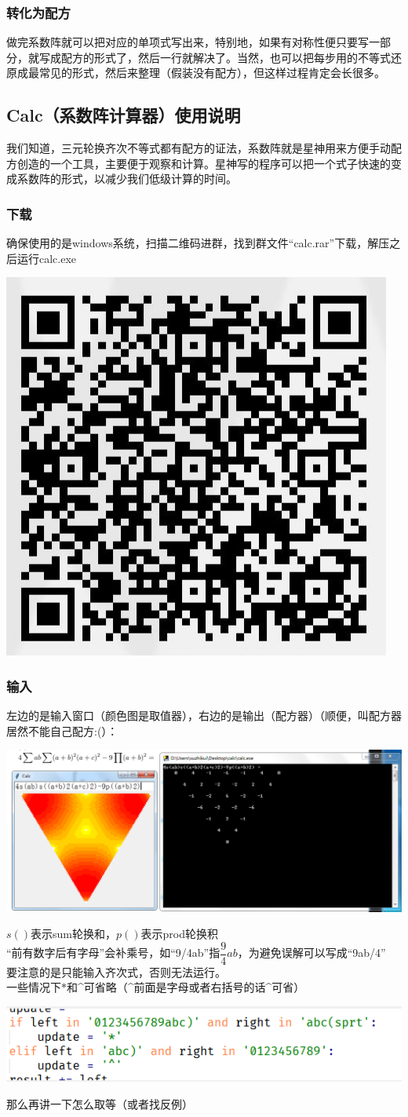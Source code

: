 \documentclass[UTF8]{ctexart}
\begin{document}
\subsubsection{转化为配方}
做完系数阵就可以把对应的单项式写出来，特别地，如果有对称性便只要写一部分，就写成配方的形式了，然后一行就解决了。当然，也可以把每步用的不等式还原成最常见的形式，然后来整理（假装没有配方），但这样过程肯定会长很多。
\subsection{Calc（系数阵计算器）使用说明}
我们知道，三元轮换齐次不等式都有配方的证法，系数阵就是星神用来方便手动配方创造的一个工具，主要便于观察和计算。星神写的程序可以把一个式子快速的变成系数阵的形式，以减少我们低级计算的时间。
\subsubsection{下载}
确保使用的是windows系统，扫描二维码进群，找到群文件“calc.rar”下载，解压之后运行calc.exe
\begin{center}
	\includegraphics[width=0.25\linewidth]{001}
\end{center}
\subsubsection{输入}
左边的是输入窗口（颜色图是取值器），右边的是输出（配方器）（顺便，叫配方器居然不能自己配方:(）：
\begin{center}
	\includegraphics[width=0.85\linewidth]{002}
\end{center}
$ s() $表示sum轮换和，$ p() $表示prod轮换积\\
“前有数字后有字母”会补乘号，如“9/4ab”指$ \dfrac{9}{4}ab $，为避免误解可以写成“9ab/4”\\
要注意的是只能输入齐次式，否则无法运行。\\
一些情况下$ * $和\^{}可省略（\^{}前面是字母或者右括号的话\^{}可省）
\begin{center}
	\includegraphics[width=0.5\linewidth]{003}
\end{center}
那么再讲一下怎么取等（或者找反例）\\
\end{document}
